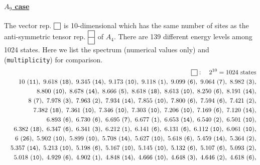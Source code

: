 \documentclass[a4paper,12pt]{article}
\def\sqr#1#2{{\vcenter{\hrule height.#2pt
      \hbox{\vrule width.#2pt height#1pt \kern#1pt
          \vrule width.#2pt}
      \hrule height.#2pt}}}
\def\twosqr#1#2{{\vcenter{\hrule height.#2pt
      \hbox{\vrule width.#2pt height#1pt \kern#1pt
          \vrule width.#2pt}
      \hrule height.#2pt
      \hbox{\vrule width.#2pt height#1pt \kern#1pt
          \vrule width.#2pt}
      \hrule height.#2pt}}}
\begin{document}
\paragraph{\underline{$A_9$ case}} The vector rep.
$\sqr{9}5$ is 10-dimensional
which has the same number of sites as the anti-symmetric
tensor rep. $\twosqr{9}5$
of $A_4$. There are 139 different energy levels among 1024 states.
Here we list the
spectrum (numerical values only) and ({\tt multiplicity}) for comparison.
\begin{eqnarray}
&& {\sqr{9}5}:\quad 2^{10}=1024\ \mbox{states} \nonumber\\
&&10     \ ({\tt 11 }),\
9.618  \ ({\tt 18 }),\
9.345  \ ({\tt 14 }),\
9.173  \ ({\tt 10 }),\
9.118  \ ({\tt 1 }),\
9.099  \ ({\tt 6 }),\
9.064  \ ({\tt 7 }),\
8.982  \ ({\tt 3 }),\nonumber\\
&&8.800  \ ({\tt 10 }),\
8.678  \ ({\tt 14 }),\
8.666  \ ({\tt 5 }),\
8.618  \ ({\tt 18 }),\
8.613  \ ({\tt 10 }),\
8.250  \ ({\tt 6 }),\
8.191  \ ({\tt 14 }),\nonumber\\
&&8  \ ({\tt 7 }),\
7.978  \ ({\tt 3 }),\
7.963  \ ({\tt 2 }),\
7.934  \ ({\tt 14 }),\
7.855  \ ({\tt 10 }),\
7.800  \ ({\tt 6 }),\
7.594  \ ({\tt 6 }),\
7.421  \ ({\tt 2 }),\nonumber\\
&&7.382  \ ({\tt 18 }),\
7.361  \ ({\tt 10 }),\
7.346  \ ({\tt 10 }),\
7.303  \ ({\tt 10 }),\
7.206  \ ({\tt 10 }),\
7.169  \ ({\tt 6 }),\
7.120  \ ({\tt 14 }),\nonumber\\
&&6.893  \ ({\tt 6 }),\
6.730  \ ({\tt 6 }),\
6.695  \ ({\tt 7 }),\
6.677  \ ({\tt 1 }),\
6.653  \ ({\tt 14 }),\
6.540  \ ({\tt 2 }),\
6.501  \ ({\tt 10 }),\nonumber\\
&&6.382  \ ({\tt 18 }),\
6.347  \ ({\tt 6 }),\
6.341  \ ({\tt 3 }),\
6.212  \ ({\tt 1 }),\
6.141  \ ({\tt 6 }),\
6.131  \ ({\tt 6 }),\
6.112  \ ({\tt 10 }),\
6.061  \ ({\tt 10 }),\nonumber\\
&&6  \ ({\tt 26 }),\
5.902  \ ({\tt 10 }),\
5.899  \ ({\tt 10 }),\
5.708  \ ({\tt 14 }),\
5.627  \ ({\tt 10 }),\
5.618  \ ({\tt 6 }),\
5.459  \ ({\tt 14 }),\
5.364  \ ({\tt 2 }),\nonumber\\
&&5.357  \ ({\tt 14 }),\
5.213  \ ({\tt 10 }),\
5.198  \ ({\tt 6 }),\
5.167  \ ({\tt 10 }),\
5.145  \ ({\tt 10 }),\
5.132  \ ({\tt 6 }),\
5.107  \ ({\tt 6 }),\
5.093  \ ({\tt 2 }),\nonumber\\
&&5.018  \ ({\tt 10 }),\
4.929  \ ({\tt 6 }),\
4.902  \ ({\tt 1 }),\
4.848  \ ({\tt 14 }),\
4.666  \ ({\tt 10 }),\
4.648  \ ({\tt 3 }),\
4.646  \ ({\tt 2 }),\
4.618  \ ({\tt 6 }),\nonumber\\

\end{eqnarray}
\end{document}
